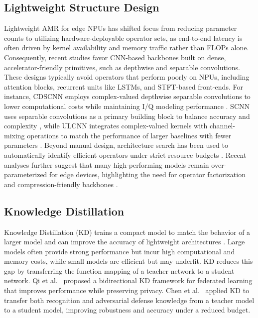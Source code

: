 \documentclass{article}
\begin{document}
	\subsection{Lightweight Structure Design}
	Lightweight AMR for edge NPUs has shifted focus from reducing parameter counts to utilizing hardware-deployable operator sets, as end-to-end latency is often driven by kernel availability and memory traffic rather than FLOPs alone. Consequently, recent studies favor CNN-based backbones built on dense, accelerator-friendly primitives, such as depthwise and separable convolutions. These designs typically avoid operators that perform poorly on NPUs, including attention blocks, recurrent units like LSTMs, and STFT-based front-ends. For instance, CDSCNN employs complex-valued depthwise separable convolutions to lower computational costs while maintaining I/Q modeling performance \cite{xiao2023Complexvalueddepthwisea}. SCNN uses separable convolutions as a primary building block to balance accuracy and complexity \cite{fu2022Lightweightautomatic}, while ULCNN integrates complex-valued kernels with channel-mixing operations to match the performance of larger baselines with fewer parameters \cite{guo2024Ultralightconvolutional}. Beyond manual design, architecture search has been used to automatically identify efficient operators under strict resource budgets \cite{zhang2023Lightweightautomatic}. Recent analyses further suggest that many high-performing models remain over-parameterized for edge devices, highlighting the need for operator factorization and compression-friendly backbones \cite{baishya2024Edgeefficientdeep}.
	
	
	\subsection{Knowledge Distillation}
	Knowledge Distillation (KD) trains a compact model to match the behavior of a larger model and can improve the accuracy of lightweight architectures \cite{lin2024GLRSEIGreen}.
	Large models often provide strong performance but incur high computational and memory costs, while small models are efficient but may underfit.
	KD reduces this gap by transferring the function mapping of a teacher network to a student network.
	Qi et al.\ \cite{qi2023FedBKDHeterogenous} proposed a bidirectional KD framework for federated learning that improves performance while preserving privacy.
	Chen et al.\ \cite{chen2024Learndefend} applied KD to transfer both recognition and adversarial defense knowledge from a teacher model to a student model, improving robustness and accuracy under a reduced budget.
	
\end{document}
